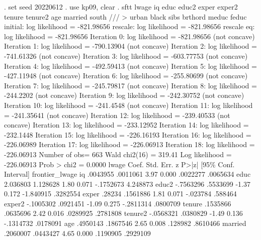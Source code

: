 . set seed 20220612
{\smallskip}
. use kp09, clear
{\smallskip}
. sftt lwage iq educ educ2 exper exper2 tenure tenure2 age married south ///
>          urban black sibs brthord meduc feduc
{\smallskip}
initial:       log likelihood = -821.98656
rescale:       log likelihood = -821.98656
rescale eq:    log likelihood = -821.98656
Iteration 0:   log likelihood = -821.98656  (not concave)
Iteration 1:   log likelihood = -790.13904  (not concave)
Iteration 2:   log likelihood = -741.61326  (not concave)
Iteration 3:   log likelihood = -603.77753  (not concave)
Iteration 4:   log likelihood = -492.59413  (not concave)
Iteration 5:   log likelihood = -427.11948  (not concave)
Iteration 6:   log likelihood = -255.80699  (not concave)
Iteration 7:   log likelihood = -245.79817  (not concave)
Iteration 8:   log likelihood =  -244.2202  (not concave)
Iteration 9:   log likelihood = -242.30752  (not concave)
Iteration 10:  log likelihood =  -241.4548  (not concave)
Iteration 11:  log likelihood = -241.35641  (not concave)
Iteration 12:  log likelihood = -239.40533  (not concave)
Iteration 13:  log likelihood = -233.12952  
Iteration 14:  log likelihood =  -232.1448  
Iteration 15:  log likelihood = -226.16193  
Iteration 16:  log likelihood = -226.06989  
Iteration 17:  log likelihood = -226.06913  
Iteration 18:  log likelihood = -226.06913  
{\smallskip}
{}Number of obs=        663
                                                  Wald chi2(16)   =     319.41
Log likelihood = -226.06913                       Prob > chi2     =     0.0000
{\smallskip}
         lwage {\VBAR}      Coef.   Std. Err.      z    P>|z|     [95\% Conf. Interval]
frontier_lwage {\VBAR}
            iq {\VBAR}   .0043955   .0011061     3.97   0.000     .0022277    .0065634
          educ {\VBAR}   2.036803   1.128628     1.80   0.071    -.1752673    4.248873
         educ2 {\VBAR}  -.7563296   .5533699    -1.37   0.172    -1.840915    .3282554
         exper {\VBAR}     .28234   .1561886     1.81   0.071     -.023784     .588464
        exper2 {\VBAR}  -.1005302   .0921451    -1.09   0.275    -.2811314    .0800709
        tenure {\VBAR}   .1535866   .0635696     2.42   0.016     .0289925    .2781808
       tenure2 {\VBAR}  -.0568321   .0380829    -1.49   0.136    -.1314732    .0178091
           age {\VBAR}   .4950143   .1867546     2.65   0.008      .128982    .8610466
       married {\VBAR}   .2060007   .0443427     4.65   0.000     .1190905    .2929109
